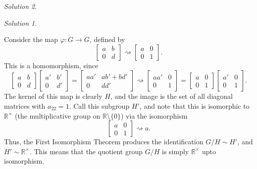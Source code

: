 \documentclass[11pt]{report}
\def\R{\mathbb{R}}
\theoremstyle{remark}
\newtheorem*{solution}{Solution}
\begin{document}
\begin{solution}
\begin{solution}
\begin{enumerate}
            Consider the map $\varphi\colon G \to G$, defined by \[
                \begin{bmatrix}
                    a & b \\ 0 & d
                \end{bmatrix} \rightsquigarrow \begin{bmatrix}
                    a & 0 \\ 0 & 1
                \end{bmatrix}.
            \] This is a homomorphism, since \[
                \begin{bmatrix}
                    a & b \\ 0 & d
                \end{bmatrix} \begin{bmatrix}
                    a' & b' \\ 0 & d'
                \end{bmatrix} = \begin{bmatrix}
                    aa' & ab' + bd' \\ 0 & dd'
                \end{bmatrix} \rightsquigarrow \begin{bmatrix}
                    aa' & 0 \\ 0 & 1
                \end{bmatrix} = \begin{bmatrix}
                    a & 0 \\ 0 & 1
                \end{bmatrix} \begin{bmatrix}
                    a' & 0 \\ 0 & 1
                \end{bmatrix}.
            \] The kernel of this map is clearly $H$, and the image is the set of all
            diagonal matrices with $a_{22} = 1$. Call this subgroup $H'$, and note
            that this is isomorphic to $\R^\times$ (the multiplicative group on
            $\R\setminus\{0\}$) via the isomorphism \[
                \begin{bmatrix}
                    a & 0 \\ 0 & 1
                \end{bmatrix} \rightsquigarrow a.
            \] Thus, the First Isomorphism Theorem produces the identification $G /H
            \sim H'$, and $H' \sim \R^\times$. This means that the quotient group
            $G/H$ is simply $\R^\times$ upto isomorphism.
            

\end{enumerate}
\end{solution}
\end{solution}
\end{document}
